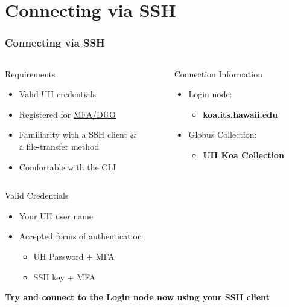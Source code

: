 \section[Connecting via SSH]{Connecting via SSH}
\begin{frame}
\frametitle{Connecting via SSH}
\begin{columns}
	\begin{column}{0.46\textwidth}
		\begin{block}{Requirements}
			\begin{itemize}
				\item Valid UH credentials 
				\item Registered for \href{http://www.hawaii.edu/its/uhlogin/}{MFA/DUO}
				\item Familiarity with a SSH client \&\\a file-transfer method
				\item Comfortable with the CLI
			\end{itemize}
                        \end{block}
	\end{column}
	\begin{column}{0.46\textwidth}
		\begin{block}{Connection Information}\
	\begin{itemize}
		\item Login node: 
		  \begin{itemize} 
		  \item \textbf{koa.its.hawaii.edu}
		  \end{itemize}
		\item Globus Collection:
		  \begin{itemize} 
		  \item \textbf{UH Koa Collection}
		  \end{itemize}
	\end{itemize}
        \end{block}
	        \end{column}                
	\end{columns}
	\begin{block}{Valid Credentials}\footnotesize
		\begin{itemize}
			\item Your UH user name
			\item Accepted forms of authentication
			\begin{itemize}\scriptsize
				\item UH Password $+$ MFA 
				\item SSH key $+$ MFA
			\end{itemize}
		\end{itemize}
	\end{block}
	\begin{center}\scriptsize
	\textbf{\large Try and connect to the {\mana} Login node now using your SSH client}
	\end{center}
\end{frame}

